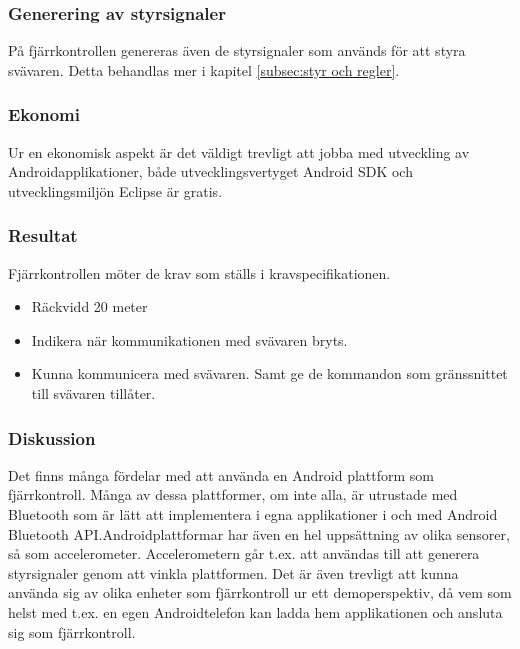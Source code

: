 \subsubsection{Generering av styrsignaler}
På fjärrkontrollen genereras även de styrsignaler som används för att styra
svävaren. Detta behandlas mer i kapitel \ref{subsec:styr och regler}.

\subsubsection{Ekonomi}
Ur en ekonomisk aspekt är det väldigt trevligt att jobba med utveckling av Androidapplikationer, både utvecklingsvertyget Android SDK och utvecklingsmiljön Eclipse är gratis.

\subsubsection{Resultat}
Fjärrkontrollen möter de krav som ställs i kravspecifikationen.

\begin {itemize}
\item Räckvidd 20 meter
\item Indikera när kommunikationen med svävaren bryts.
\item Kunna kommunicera med svävaren. Samt ge de kommandon som gränssnittet till svävaren tillåter.
\end {itemize}

\subsubsection{Diskussion}
Det finns många fördelar med att använda en Android plattform som fjärrkontroll. Många av dessa plattformer, om inte alla, är utrustade med Bluetooth som är lätt att implementera i egna applikationer i och med Android Bluetooth API.Androidplattformar har även en hel uppsättning av olika sensorer, så som accelerometer. Accelerometern går t.ex. att användas till att generera styrsignaler genom att vinkla plattformen.
Det är även trevligt att kunna använda sig av olika enheter som fjärrkontroll ur ett demoperspektiv, då vem som helst med t.ex. en egen Androidtelefon kan ladda hem applikationen och ansluta sig som fjärrkontroll. 






